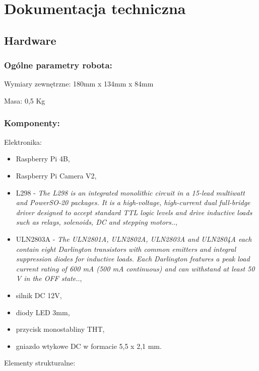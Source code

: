 \section{Dokumentacja techniczna}
\subsection{Hardware}
\subsubsection{Ogólne parametry robota:}
Wymiary zewnętrzne: 180mm x  134mm x 84mm

Masa: 0,5 Kg

\subsubsection{Komponenty:}
Elektronika:
    \begin{itemize}
        \item Raspberry Pi 4B,
        \item Raspberry Pi Camera V2,
        \item L298 - \textit{The L298 is an integrated monolithic circuit in a 15-lead multiwatt and PowerSO-20
        packages. It is a high-voltage, high-current dual full-bridge driver designed to accept
        standard TTL logic levels and drive inductive loads such as relays, solenoids, DC
        and stepping motors.}.\cite{L298},
        \item ULN2803A - \textit{The ULN2801A, ULN2802A, ULN2803A and
        ULN2804A each contain eight Darlington
        transistors with common emitters and integral
        suppression diodes for inductive loads. Each
        Darlington features a peak load current rating of
        600 mA (500 mA continuous) and can withstand
        at least 50 V in the OFF state.}.\cite{ULN2803a},
        \item silnik DC 12V,
        \item diody LED 3mm,
        \item przycisk monostabliny THT,
        \item gniazdo wtykowe DC w formacie 5,5 x 2,1 mm.
    \end{itemize}

Elementy strukturalne:

